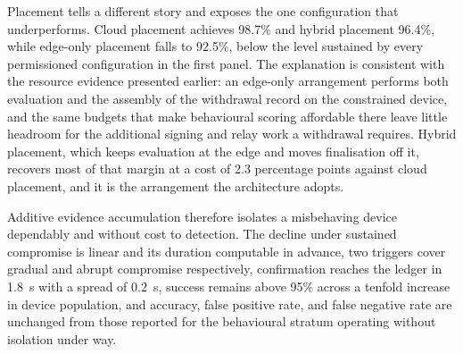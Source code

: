 Placement tells a different story and exposes the one configuration that underperforms. Cloud placement achieves 98.7\% and hybrid placement 96.4\%, while edge-only placement falls to 92.5\%, below the level sustained by every permissioned configuration in the first panel. The explanation is consistent with the resource evidence presented earlier: an edge-only arrangement performs both evaluation and the assembly of the withdrawal record on the constrained device, and the same budgets that make behavioural scoring affordable there leave little headroom for the additional signing and relay work a withdrawal requires. Hybrid placement, which keeps evaluation at the edge and moves finalisation off it, recovers most of that margin at a cost of 2.3 percentage points against cloud placement, and it is the arrangement the architecture adopts.

Additive evidence accumulation therefore isolates a misbehaving device dependably and without cost to detection. The decline under sustained compromise is linear and its duration computable in advance, two triggers cover gradual and abrupt compromise respectively, confirmation reaches the ledger in 1.8~s with a spread of 0.2~s, success remains above 95\% across a tenfold increase in device population, and accuracy, false positive rate, and false negative rate are unchanged from those reported for the behavioural stratum operating without isolation under way.


